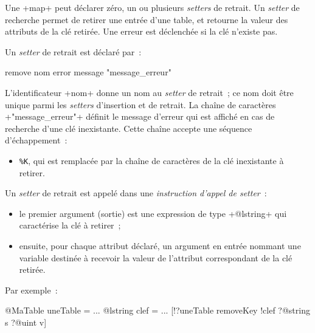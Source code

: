 
Une \ggst+map+ peut déclarer zéro, un ou plusieurs \emph{setters} de retrait. Un \emph{setter} de recherche permet de retirer une entrée d'une table, et retourne la valeur des attributs de la clé retirée. Une erreur est déclenchée si la clé n'existe pas.


Un \emph{setter} de retrait est déclaré par~:

\begin{galgas3}
remove nom error message "message_erreur"
\end{galgas3}

\begin{galgas4}
\end{galgas4}

L'identificateur \ggst+nom+ donne un nom au \emph{setter} de retrait~; ce nom doit être unique parmi les \emph{setters} d'insertion et de retrait. La chaîne de caractères \ggst+"message_erreur"+ définit le message d'erreur qui est affiché en cas de recherche d'une clé inexistante. Cette chaîne accepte une séquence d'échappement~:
\begin{itemize}
  \item \texttt{\%K}, qui est remplacée par la chaîne de caractères de la clé inexistante à retirer.
\end{itemize}


Un \emph{setter} de retrait est appelé dans une \emph{instruction d'appel de setter}~:
\begin{itemize}
  \item le premier argument (sortie) est une expression de type \ggst+@lstring+ qui caractérise la clé à retirer~;
  \item ensuite, pour chaque attribut déclaré, un argument en entrée nommant une variable destinée à recevoir la valeur de l'attribut correspondant de la clé retirée.
\end{itemize}

Par exemple~:
\begin{galgas3}
@MaTable uneTable = {}
...
@lstring clef = ...
[!?uneTable removeKey !clef ?@string s ?@uint v]
\end{galgas3}


%
%

